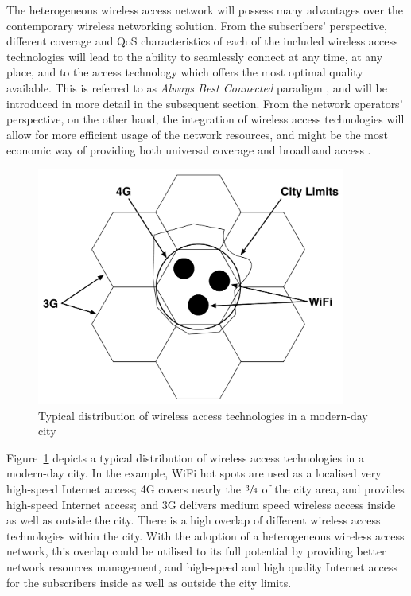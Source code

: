 The heterogeneous wireless access network will possess many advantages over the contemporary wireless networking solution. From the subscribers' perspective, different coverage and QoS characteristics of each of the included wireless access technologies will lead to the ability to seamlessly connect at any time, at any place, and to the access technology which offers the most optimal quality available. This is referred to as \emph{Always Best Connected} paradigm \cite{ABC03}, and will be introduced in more detail in the subsequent section. From the network operators' perspective, on the other hand, the integration of wireless access technologies will allow for more efficient usage of the network resources, and might be the most economic way of providing both universal coverage and broadband access \cite{HossainBeaubrun09}.

\begin{figure}[t]
    \centering
    \includegraphics[width=4in]{Intelligent/Figures/wireless_city}
    \caption{Typical distribution of wireless access technologies in a modern-day city}
    \label{fig:wireless_city_intelligent}
\end{figure}

Figure~\ref{fig:wireless_city_intelligent} depicts a typical distribution of wireless access technologies in a modern-day city. In the example, WiFi hot spots are used as a localised very high-speed Internet access; 4G covers nearly the $\sfrac{3}{4}$ of the city area, and provides high-speed Internet access; and 3G delivers medium speed wireless access inside as well as outside the city. There is a high overlap of different wireless access technologies within the city. With the adoption of a heterogeneous wireless access network, this overlap could be utilised to its full potential by providing better network resources management, and high-speed and high quality Internet access for the subscribers inside as well as outside the city limits.

